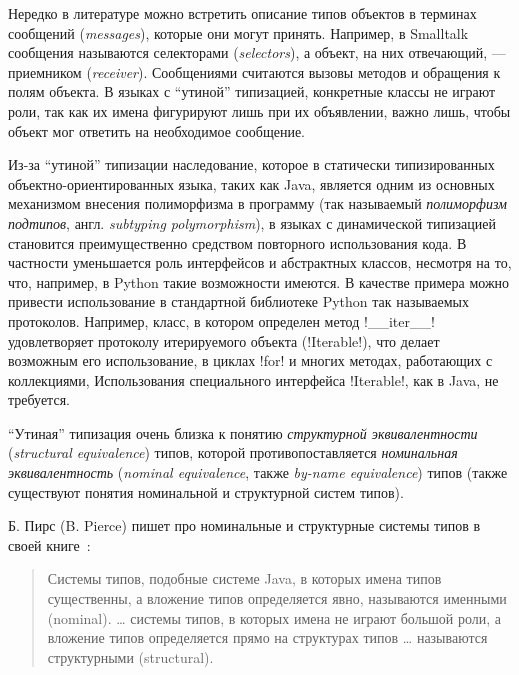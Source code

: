 Нередко в литературе можно встретить описание типов объектов в терминах
сообщений (\emph{messages}), которые они могут принять. Например, в Smalltalk
сообщения называются селекторами (\emph{selectors}), а объект, на них отвечающий, ---
приемником (\emph{receiver}). Сообщениями считаются вызовы методов и обращения к полям
объекта. В языках с ``утиной'' типизацией, конкретные классы не играют роли, так
как их имена фигурируют лишь при их объявлении, важно лишь, чтобы объект мог
ответить на необходимое сообщение.  

Из-за ``утиной'' типизации наследование, которое в статически
типизированных объектно-ориентированных языка, таких как Java, является
одним из основных механизмом внесения полиморфизма в программу (так называемый
\emph{полиморфизм подтипов}, англ. \emph{subtyping polymorphism}),
в языках с динамической типизацией становится преимущественно средством
повторного использования кода. В частности уменьшается роль интерфейсов и
абстрактных классов, несмотря на то, что, например, в Python такие возможности
имеются. В качестве примера можно привести использование в
стандартной библиотеке Python так называемых протоколов. Например, класс, в
котором определен метод !__iter__! удовлетворяет протоколу
итерируемого объекта (!Iterable!), что делает возможным его использование,
в циклах !for! и многих методах, работающих с коллекциями, 
Использования специального интерфейса !Iterable!, как в Java, не требуется.

``Утиная'' типизация очень близка к понятию \emph{структурной эквивалентности}
(\emph{structural equivalence}) типов, которой противопоставляется
\emph{номинальная эквивалентность} (\emph{nominal equivalence}, также
\emph{by-name equivalence}) типов (также существуют понятия номинальной и
структурной систем типов).

Б. Пирс (B. Pierce) пишет про номинальные и структурные системы
типов в своей книге~\cite{Pierce2002}:

\begin{quote}
  Системы типов, подобные системе Java, в которых имена типов существенны, а
  вложение типов определяется явно, называются именными (nominal). \ldots
  системы типов, в которых имена не играют большой роли,
  а вложение типов определяется прямо на структурах типов \ldots
  называются структурными (structural).

\end{quote}

